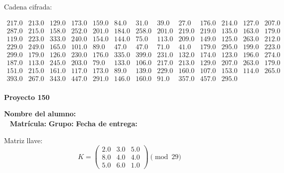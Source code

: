 \documentclass[12pt]{article}
\begin{document}
Cadena cifrada:
\begin{center}
$\begin{array}{lllllllllllll}
217.0 & 213.0 & 129.0 & 173.0 & 159.0 & 84.0 & 31.0 & 39.0 & 27.0 & 176.0 & 214.0 & 127.0 & 207.0\\
287.0 & 215.0 & 158.0 & 252.0 & 201.0 & 184.0 & 258.0 & 201.0 & 219.0 & 219.0 & 135.0 & 163.0 & 179.0\\
119.0 & 223.0 & 333.0 & 240.0 & 154.0 & 144.0 & 75.0 & 113.0 & 209.0 & 149.0 & 125.0 & 263.0 & 212.0\\
229.0 & 249.0 & 165.0 & 101.0 & 89.0 & 47.0 & 47.0 & 71.0 & 41.0 & 179.0 & 295.0 & 199.0 & 223.0\\
299.0 & 179.0 & 126.0 & 230.0 & 176.0 & 335.0 & 399.0 & 231.0 & 132.0 & 174.0 & 123.0 & 196.0 & 274.0\\
187.0 & 113.0 & 245.0 & 203.0 & 79.0 & 133.0 & 106.0 & 217.0 & 213.0 & 129.0 & 207.0 & 263.0 & 179.0\\
151.0 & 215.0 & 161.0 & 117.0 & 173.0 & 89.0 & 139.0 & 229.0 & 160.0 & 107.0 & 153.0 & 114.0 & 265.0\\
393.0 & 267.0 & 343.0 & 447.0 & 291.0 & 146.0 & 160.0 & 91.0 & 357.0 & 457.0 & 295.0\\
\end{array}$
\end{center}

\newpage


\textbf{Proyecto 150}

\textbf{Nombre del alumno:} \underline{\hspace{13cm}}\\\
\vspace{1cm}
\textbf{Matrícula:} \underline{\hspace{4cm}} \hspace{1cm}
\textbf{Grupo:} \underline{\hspace{2cm}}
\textbf{Fecha de entrega:} \underline{\hspace{2cm}}

\medskip

Matriz llave:
\[
K = \begin{pmatrix}
2.0 & 3.0 & 5.0\\
8.0 & 4.0 & 4.0\\
5.0 & 6.0 & 1.0
\end{pmatrix} \pmod{29}
\]
\end{document}
